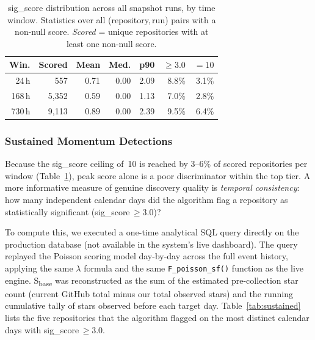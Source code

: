 \documentclass[sigconf]{acmart}
\begin{document}
\begin{table}[ht]
  \caption{sig\_score distribution across all snapshot runs, by time window.
    Statistics over all (repository,\,run) pairs with a non-null score.
    \emph{Scored} = unique repositories with at least one non-null score.}
  \label{tab:scoredist}
  \centering
  \begin{tabular}{r r r r r r r}
    \toprule
    \textbf{Win.} & \textbf{Scored} & \textbf{Mean} & \textbf{Med.}
      & \textbf{p90} & ${\geq}3.0$ & $=10$ \\
    \midrule
    24\,h  &     557 & 0.71 & 0.00 & 2.09 &  8.8\% & 3.1\% \\
    168\,h &  5{,}352 & 0.59 & 0.00 & 1.13 &  7.0\% & 2.8\% \\
    730\,h &  9{,}113 & 0.89 & 0.00 & 2.39 &  9.5\% & 6.4\% \\
    \bottomrule
  \end{tabular}
\end{table}

\subsubsection{Sustained Momentum Detections}
\label{sec:eval-hg-sustained}

Because the sig\_score ceiling of~10 is reached by 3--6\% of scored
repositories per window (Table~\ref{tab:scoredist}), peak score alone is a
poor discriminator within the top tier. A more informative measure of genuine
discovery quality is \emph{temporal consistency}: how many independent calendar
days did the algorithm flag a repository as statistically significant
(sig\_score\,$\geq 3.0$)?

To compute this, we executed a one-time analytical SQL query directly on the
production database (not available in the system's live dashboard). The query
replayed the Poisson scoring model day-by-day across the full event history,
applying the same $\lambda$ formula and the same \texttt{F\_poisson\_sf()}
function as the live engine. S\textsubscript{base} was reconstructed as the sum
of the estimated pre-collection star count (current GitHub total minus our total
observed stars) and the running cumulative tally of stars observed before each
target day. Table~\ref{tab:sustained} lists the five repositories that the
algorithm flagged on the most distinct calendar days with sig\_score\,$\geq 3.0$.
\end{document}
